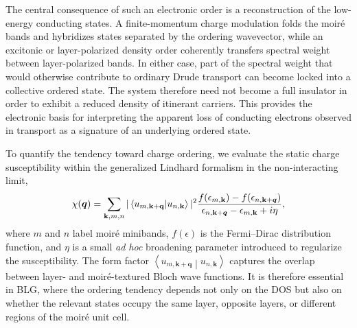 \documentclass[aps,prx,article,twocolumn,amsmath,amssymb,superscriptaddress,longbibliography]{revtex4-2}
\begin{document}
The central consequence of such an electronic order is a reconstruction of the low-energy conducting states. A finite-momentum charge modulation folds the moiré bands and hybridizes states separated by the ordering wavevector, while an excitonic or layer-polarized density order coherently transfers spectral weight between layer-polarized bands. In either case, part of the spectral weight that would otherwise contribute to ordinary Drude transport can become locked into a collective ordered state. The system therefore need not become a full insulator in order to exhibit a reduced density of itinerant carriers. This provides the electronic basis for interpreting the apparent loss of conducting electrons observed in transport as a signature of an underlying ordered state.

To quantify the tendency toward charge ordering, we evaluate the static charge susceptibility within the generalized Lindhard formalism in the non-interacting limit,
\begin{align}\label{eq:susceptibility}
\chi({\vb*{q}}) =
\sum_{\mathbf{k},m,n}|\left\langle u_{m,\mathbf k+\mathbf q} \middle| u_{n,\mathbf k}\right\rangle|^2
\frac{f(\epsilon_{m,\mathbf{k}})-f(\epsilon_{n,\mathbf{k}+{\vb*{q}}})}
{\epsilon_{n,\mathbf{k}+{\vb*{q}}}-\epsilon_{m,\mathbf{k}}+i\eta},
\end{align}
where $m$ and $n$ label moiré minibands, $f(\epsilon)$ is the Fermi--Dirac distribution function, and $\eta$ is a small \textit{ad hoc} broadening parameter introduced to regularize the susceptibility. The form factor $\left\langle u_{m,\mathbf k+\mathbf q} \middle| u_{n,\mathbf k}\right\rangle$ captures the overlap between layer- and moiré-textured Bloch wave functions. It is therefore essential in BLG, where the ordering tendency depends not only on the DOS but also on whether the relevant states occupy the same layer, opposite layers, or different regions of the moiré unit cell.
\end{document}
